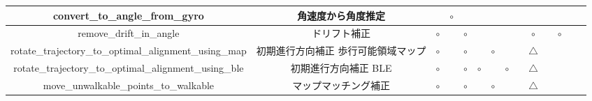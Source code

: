 \begin{table}[ht]
{\begin{tabular}{|c|c|c|c|c|c|c|c|c|c|c|c|c|c|}
			convert\_to\_angle\_from\_gyro                                       & 角速度から角度推定          &                              & \multicolumn{1}{c|}{$\circ$} &                              &                              &                                                                                                                                             &                              &                                  &                                  &    &                              &    \\ \hline
			remove\_drift\_in\_angle                                           & ドリフト補正              & \multicolumn{1}{c|}{$\circ$} &                              & \multicolumn{1}{c|}{$\circ$} &                              &                                                                                                                                             &                              &                                  & \multicolumn{1}{c|}{$\circ$}     &    & \multicolumn{1}{c|}{$\circ$} &    \\ \hline
			rotate\_trajectory\_to\_optimal\_alignment\_using\_map             &  初期進行方向補正 歩行可能領域マップ & \multicolumn{1}{c|}{$\circ$} &                              & \multicolumn{1}{c|}{$\circ$} &                              & \multicolumn{1}{c|}{$\circ$}                                                                                                                &                              &                                  & \multicolumn{1}{c|}{$\triangle$} &    &                              &    \\ \hline
			rotate\_trajectory\_to\_optimal\_alignment\_using\_ble             &  初期進行方向補正 BLE       & \multicolumn{1}{c|}{$\circ$} &                              & \multicolumn{1}{c|}{$\circ$} & \multicolumn{1}{c|}{$\circ$} &                                                                                                                                             & \multicolumn{1}{c|}{$\circ$} &                                  & \multicolumn{1}{c|}{$\triangle$} &    &                              &    \\ \hline
			move\_unwalkable\_points\_to\_walkable                             &  マップマッチング補正        & \multicolumn{1}{c|}{$\circ$} &                              & \multicolumn{1}{c|}{$\circ$} &                              & \multicolumn{1}{c|}{$\circ$}                                                                                                                &                              &                                  & \multicolumn{1}{c|}{$\triangle$} &    &                              &    \\ \hline

\end{tabular}}
\end{table}
